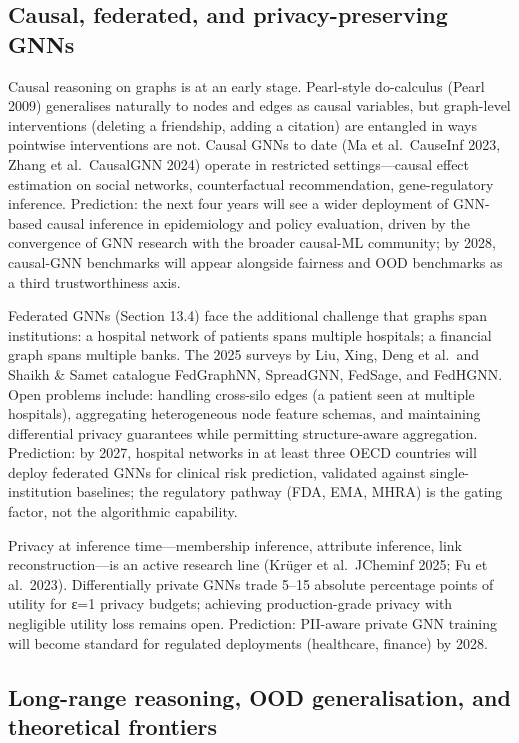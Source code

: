 \documentclass{article}
\begin{document}
\subsection{Causal, federated, and privacy-preserving GNNs}\label{causal-federated-and-privacy-preserving-gnns}

Causal reasoning on graphs is at an early stage. Pearl-style do-calculus (Pearl 2009) generalises naturally to nodes and edges as causal variables, but graph-level interventions (deleting a friendship, adding a citation) are entangled in ways pointwise interventions are not. Causal GNNs to date (Ma et al.~CauseInf 2023, Zhang et al.~CausalGNN 2024) operate in restricted settings---causal effect estimation on social networks, counterfactual recommendation, gene-regulatory inference. Prediction: the next four years will see a wider deployment of GNN-based causal inference in epidemiology and policy evaluation, driven by the convergence of GNN research with the broader causal-ML community; by 2028, causal-GNN benchmarks will appear alongside fairness and OOD benchmarks as a third trustworthiness axis.

Federated GNNs (Section 13.4) face the additional challenge that graphs span institutions: a hospital network of patients spans multiple hospitals; a financial graph spans multiple banks. The 2025 surveys by Liu, Xing, Deng et al.~and Shaikh \& Samet catalogue FedGraphNN, SpreadGNN, FedSage, and FedHGNN. Open problems include: handling cross-silo edges (a patient seen at multiple hospitals), aggregating heterogeneous node feature schemas, and maintaining differential privacy guarantees while permitting structure-aware aggregation. Prediction: by 2027, hospital networks in at least three OECD countries will deploy federated GNNs for clinical risk prediction, validated against single-institution baselines; the regulatory pathway (FDA, EMA, MHRA) is the gating factor, not the algorithmic capability.

Privacy at inference time---membership inference, attribute inference, link reconstruction---is an active research line (Krüger et al.~JCheminf 2025; Fu et al.~2023). Differentially private GNNs trade 5--15 absolute percentage points of utility for ε=1 privacy budgets; achieving production-grade privacy with negligible utility loss remains open. Prediction: PII-aware private GNN training will become standard for regulated deployments (healthcare, finance) by 2028.

\subsection{Long-range reasoning, OOD generalisation, and theoretical frontiers}\label{long-range-reasoning-ood-generalisation-and-theoretical-frontiers}
\end{document}
